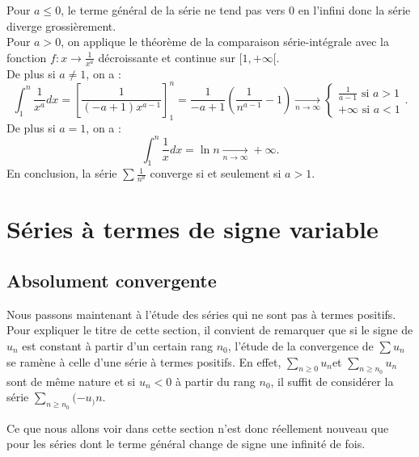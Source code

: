 \documentclass{book}
\begin{document}
\begin{Demonstration}
Pour $a\leq 0$, le terme général de la série ne tend pas vers 0 en l'infini donc la série diverge grossièrement.\\
Pour $a>0$, on applique le théorème de la comparaison série-intégrale avec la fonction $f:x\to\frac{1}{x^a}$ décroissante et continue sur $[1,+\infty[$.\\
De plus si $a\neq 1$, on a   :
$$ \int_{1}^n \frac{1}{x^a} dx =
\left[\frac{1}{(-a+1)x^{a-1} }\right]_1^n=\frac{1}{-a+1}\left(\frac{1}{n^{a-1}}-1\right) \xrightarrow[n\to \infty]{}\begin{cases}
\frac{1}{a-1} \text{ si }a> 1 \\
+\infty\text{ si }a< 1
\end{cases}.$$ 
De plus si $a= 1$, on a   :
$$ \int_{1}^n \frac{1}{x} dx = \ln n  \xrightarrow[n\to \infty]{}+\infty .$$ 
En conclusion, la série $\sum \frac{1}{n^a}$ converge si et seulement si $a> 1$.
\end{Demonstration}

\section{Séries à termes de signe variable}
\subsection{Absolument convergente}
Nous passons maintenant à l'étude des séries qui ne sont pas à termes positifs. Pour expliquer le titre de cette section,
 il convient de remarquer que si le signe de $u_n$ est constant
à partir d'un certain rang $n_0$, l'étude de la convergence de $\sum u_n$ se ramène à celle d'une
série à termes positifs. En effet, $\sum_{n\geq 0} u_n$et $\sum_{n\geq n_0} u_n$ sont de même nature et si $u_n < 0$ à partir du rang $n_0$, il suffit de considérer la série $\sum
_{n\geq n_0} (-u_)n$.

Ce que nous allons voir dans cette section n'est donc réellement nouveau que pour les séries dont le terme général change de signe
une infinité de fois.
\end{document}
